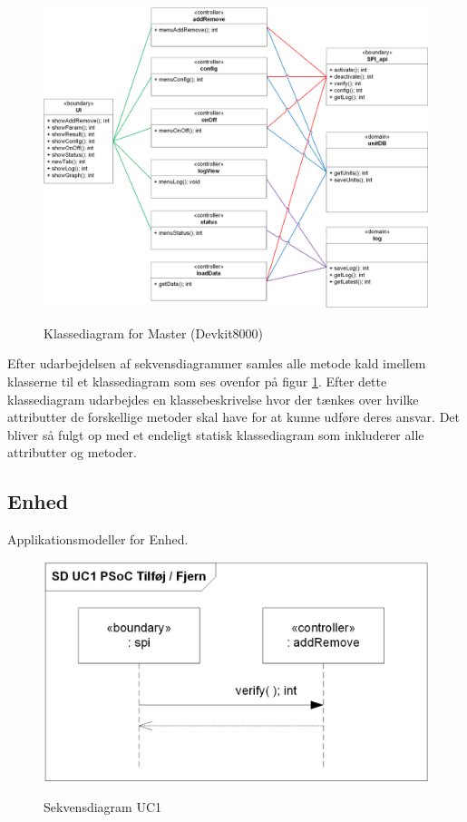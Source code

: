 \clearpage
\begin{figure}[htbp] \centering
{\includegraphics[width=\textwidth]{filer/design/sw_class_devkit}}
\caption{Klassediagram for Master (Devkit8000)}
\label{fig:klassediagram devkit8000}
\end{figure} 

Efter udarbejdelsen af sekvensdiagrammer samles alle metode kald imellem klasserne til et klassediagram som ses ovenfor på figur \ref{fig:klassediagram devkit8000}. Efter dette klassediagram udarbejdes en klassebeskrivelse hvor der tænkes over hvilke attributter de forskellige metoder skal have for at kunne udføre deres ansvar. Det bliver så fulgt op med et endeligt statisk klassediagram som inkluderer alle attributter og metoder.

\clearpage
\subsection{Enhed}
Applikationsmodeller for Enhed.

\begin{figure}[htbp] \centering
{\includegraphics[scale=1]{filer/design/a_psoc_uc1}}
\caption{Sekvensdiagram UC1}
\label{fig:psoc_sd_uc1}
\end{figure} 

